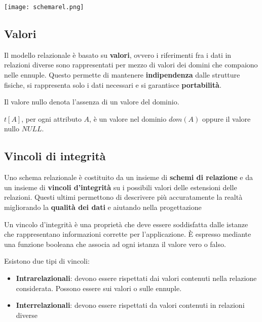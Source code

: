 \begin{center}
	\texttt{[image: schemarel.png]}
\end{center}

\subsection{Valori}
Il modello relazionale è basato su \textbf{valori}, ovvero i riferimenti fra i dati in relazioni diverse sono rappresentati per mezzo di valori dei domini che compaiono nelle ennuple. Questo permette di mantenere \textbf{indipendenza} dalle strutture fisiche, si rappresenta solo i dati necessari e si garantisce \textbf{portabilità}.

\begin{definition}
	Il valore nullo denota l'assenza di un valore del dominio.
\end{definition}

\begin{definition}[Valore]
	$t[A]$, per ogni attributo $A$, è un valore nel dominio $dom(A)$ oppure il valore nullo $NULL$.
\end{definition}

\subsection{Vincoli di integrità}
Uno schema relazionale è costituito da un insieme di \textbf{schemi di relazione} e da un insieme di \textbf{vincoli d'integrità} su i possibili valori delle estensioni delle relazioni. Questi ultimi permettono di descrivere più accuratamente la realtà migliorando la \textbf{qualità dei dati} e aiutando nella progettazione

\begin{definition}
	Un vincolo d’integrità è una proprietà che deve essere soddisfatta dalle istanze che rappresentano informazioni corrette per l’applicazione. È espresso mediante una funzione booleana che associa ad ogni istanza il valore vero o falso.
\end{definition}

Esistono due tipi di vincoli: 
\begin{itemize}
	\item \textbf{Intrarelazionali}: devono essere rispettati dai valori contenuti nella relazione considerata. Possono essere sui valori o sulle ennuple.
	\item \textbf{Interrelazionali}: devono essere rispettati da valori contenuti in relazioni diverse
\end{itemize}

